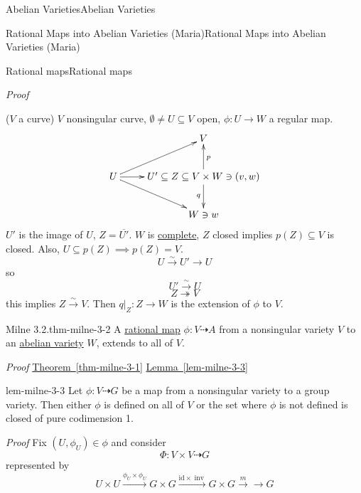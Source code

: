 \documentclass[10pt,]{book}
\makeatletter
\renewcommand*{\proofname}{Proof}
\renewenvironment{proof}[1][\proofname]{\par
  \pushQED{\qed}%
  \normalfont \topsep6\p@\@plus6\p@\relax
  \trivlist
  \item\relax
    {\itshape
    #1\@addpunct{.}}\hspace\labelsep\ignorespaces
}{%
  \popQED\endtrivlist\@endpefalse
}
\numberwithin{equation}{section}
\newcommand{\id}{\mathrm{id}}
\makeatother
\begin{document}
\begin{chapterptx}{Abelian Varieties}{}{Abelian Varieties}{}{}
\begin{sectionptx}{Rational Maps into Abelian Varieties (Maria)}{}{Rational Maps into Abelian Varieties (Maria)}{}{}
\begin{subsectionptx}{Rational maps}{}{Rational maps}{}{}
\begin{proof}
\hypertarget{p-88}{}%
(\(V\) a curve) \(V\) nonsingular curve, \(\emptyset\ne U\subseteq V\) open, \(\phi\colon U \to W\) a regular map.%
\begin{equation*}
\xymatrix{
& V\\
U\ar[ur]\ar[dr] \ar[r] & U' \subseteq Z \subseteq V\times W \ni (v,w)\ar[d]_q \ar[u]_p \\
& W \ni w
}
\end{equation*}
\(U'\) is the image of \(U\), \(Z = \overline{U'}\). \(W \) is \hyperref[def-abelian-complete-var]{complete}, \(Z\) closed implies \(p(Z) \subseteq V\) is closed. Also, \(U \subseteq p(Z) \implies p(Z)= V\).%
\begin{equation*}
U\xrightarrow{\sim} U' \to U
\end{equation*}
so%
\begin{equation*}
U' \xrightarrow{\sim} U
\end{equation*}
%
\begin{equation*}
Z \twoheadrightarrow V
\end{equation*}
this implies \(Z \xrightarrow\sim V\). Then \(q|_Z \colon Z \to W\) is the extension of \(\phi \) to \(V\).%
\end{proof}
\begin{theorem}{Milne 3.2.}{}{thm-milne-3-2}%
\hypertarget{p-89}{}%
A \hyperref[def-rational-map]{rational map} \(\phi\colon V\dashrightarrow A\) from a nonsingular variety \(V\) to an \hyperref[def-buntes-abvar]{abelian variety} \(W\), extends to all of \(V\).%
\end{theorem}
\begin{proof}\hypertarget{proof-13}{}
\hypertarget{p-90}{}%
\hyperref[thm-milne-3-1]{Theorem~\ref{thm-milne-3-1}} \hyperref[lem-milne-3-3]{Lemma~\ref{lem-milne-3-3}}%
\end{proof}
\begin{lemma}{}{}{lem-milne-3-3}%
\hypertarget{p-91}{}%
Let \(\phi\colon V \dashrightarrow G\) be a map from a nonsingular variety to a group variety. Then either \(\phi\) is defined on all of \(V\) or the set where \(\phi\) is not defined is closed of pure codimension 1.%
\end{lemma}
\begin{proof}\hypertarget{proof-14}{}
\hypertarget{p-92}{}%
Fix \((U, \phi_U) \in \phi\) and consider%
\begin{equation*}
\Phi\colon V\times V \dashrightarrow G
\end{equation*}
represented by%
\begin{equation*}
U\times U\xrightarrow{\phi_U\times\phi_U} G\times G \xrightarrow{\id\times\operatorname{inv}} G\times G \xrightarrow{m} \to G

\end{equation*}
\end{proof}
\end{subsectionptx}
\end{sectionptx}
\end{chapterptx}
\end{document}
